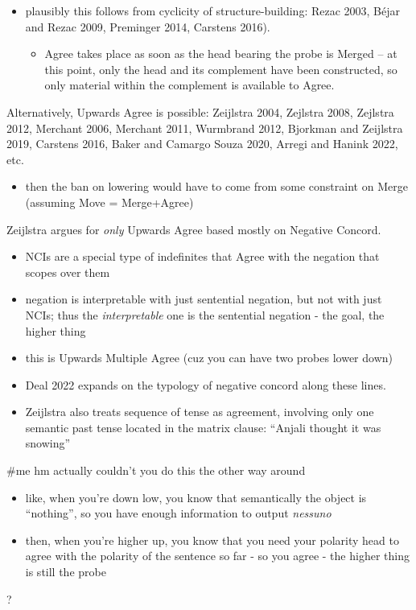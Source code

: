 \begin{itemize}
  \item plausibly this follows from cyclicity of structure-building: Rezac 2003, Béjar and Rezac 2009, Preminger 2014, Carstens 2016).
  \begin{itemize}
    \item Agree takes place as soon as the head bearing the probe is Merged -- at this point, only the head and its complement have been constructed, so only material within the complement is available to Agree.
  \end{itemize}
\end{itemize}

Alternatively, Upwards Agree is possible: Zeijlstra 2004, Zejlstra 2008, Zejlstra 2012, Merchant 2006, Merchant 2011, Wurmbrand 2012, Bjorkman and Zeijlstra 2019, Carstens 2016, Baker and Camargo Souza 2020, Arregi and Hanink 2022, etc.

\begin{itemize}
  \item then the ban on lowering would have to come from some constraint on Merge (assuming Move = Merge+Agree)
\end{itemize}

Zeijlstra argues for \textit{only} Upwards Agree based mostly on Negative Concord.

\begin{itemize}
  \item NCIs are a special type of indefinites that Agree with the negation that scopes over them
  \item negation is interpretable with just sentential negation, but not with just NCIs; thus the \textit{interpretable} one is the sentential negation - the goal, the higher thing
  \item this is Upwards Multiple Agree (cuz you can have two probes lower down)
  \item Deal 2022 expands on the typology of negative concord along these lines.
  \item Zeijlstra also treats sequence of tense as agreement, involving only one semantic past tense located in the matrix clause: ``Anjali thought it was snowing''
\end{itemize}

\#me hm actually couldn't you do this the other way around

\begin{itemize}
  \item like, when you're down low, you know that semantically the object is ``nothing'', so you have enough information to output \textit{nessuno}
  \item then, when you're higher up, you know that you need your polarity head to agree with the polarity of the sentence so far - so you agree - the higher thing is still the probe
\end{itemize}
?

